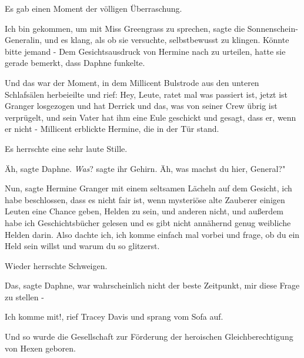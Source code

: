 Es gab einen Moment der völligen Überraschung.

\glqq Ich bin gekommen, um mit Miss Greengrass zu sprechen\grqq{}, sagte die
Sonnenschein-Generalin, und es klang, als ob sie versuchte, selbstbewusst zu
klingen. \glqq Könnte bitte jemand -\grqq{} Dem Gesichtsausdruck von Hermine
nach zu urteilen, hatte sie gerade bemerkt, dass Daphne funkelte.

Und das war der Moment, in dem Millicent Bulstrode aus den unteren Schlafsälen
herbeieilte und rief: \glqq Hey, Leute, ratet mal was passiert ist, jetzt ist
Granger losgezogen und hat Derrick und das, was von seiner Crew übrig ist
verprügelt, und sein Vater hat ihm eine Eule geschickt und gesagt, dass er, wenn
er nicht -\grqq{} Millicent erblickte Hermine, die in der Tür stand.

Es herrschte eine sehr laute Stille.

\glqq Äh\grqq{}, sagte Daphne. \emph{Was}? sagte ihr Gehirn. \glqq Äh, was
machst du hier, General?"

\glqq Nun\grqq{}, sagte Hermine Granger mit einem seltsamen Lächeln auf dem
Gesicht, \glqq ich habe beschlossen, dass es nicht fair ist, wenn mysteriöse
alte Zauberer einigen Leuten eine Chance geben, Helden zu sein, und anderen
nicht, und außerdem habe ich Geschichtsbücher gelesen und es gibt nicht
annähernd genug weibliche Helden darin. Also dachte ich, ich komme einfach mal
vorbei und frage, ob du ein Held sein willst und warum du so glitzerst.\grqq{}

Wieder herrschte Schweigen.

\glqq Das\grqq{}, sagte Daphne, \glqq war wahrscheinlich nicht der beste
Zeitpunkt, mir diese Frage zu stellen -\grqq{}

\glqq Ich komme mit!\grqq{}, rief Tracey Davis und sprang vom Sofa auf.

Und so wurde die Gesellschaft zur Förderung der heroischen Gleichberechtigung
von Hexen geboren.

